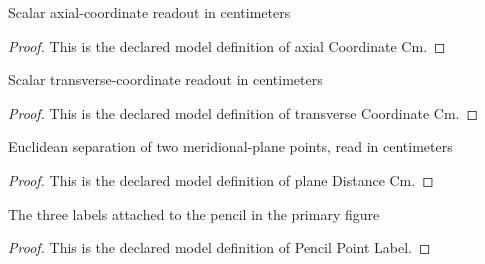 \begin{definition}
  \label{def:physics:phyx-mini-0115:phyxminiproblems-problemphyxmini0115-axialcoordinatecm}
  Scalar axial-coordinate readout in centimeters
\end{definition}
\begin{proof}
  This is the declared model definition of axial Coordinate Cm.
\end{proof}
\begin{definition}
  \label{def:physics:phyx-mini-0115:phyxminiproblems-problemphyxmini0115-transversecoordinatecm}
  Scalar transverse-coordinate readout in centimeters
\end{definition}
\begin{proof}
  This is the declared model definition of transverse Coordinate Cm.
\end{proof}
\begin{definition}
  \label{def:physics:phyx-mini-0115:phyxminiproblems-problemphyxmini0115-planedistancecm}
  Euclidean separation of two meridional-plane points, read in centimeters
\end{definition}
\begin{proof}
  This is the declared model definition of plane Distance Cm.
\end{proof}
\begin{definition}
  \label{def:physics:phyx-mini-0115:phyxminiproblems-problemphyxmini0115-pencilpointlabel}
  The three labels attached to the pencil in the primary figure
\end{definition}
\begin{proof}
  This is the declared model definition of Pencil Point Label.
\end{proof}
